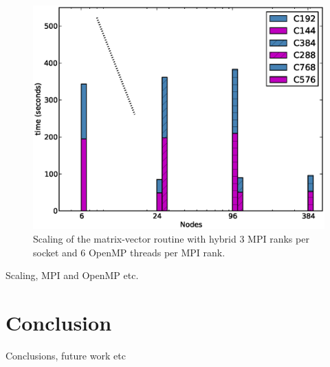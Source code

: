 \documentclass[times]{elsarticle}
\begin{document}
\begin{figure}
  \begin{center}
    \includegraphics[width=0.9\linewidth]{strong_mv_T6.eps}
    \caption{\label{fig:scale_T6}Scaling of the matrix-vector routine 
      with hybrid 3 MPI ranks per socket and 6 OpenMP threads per MPI rank.}
  \end{center}
\end{figure}

Scaling, MPI and OpenMP etc.

\section{Conclusion}
\label{sec:con}
Conclusions, future work etc



\end{document}
